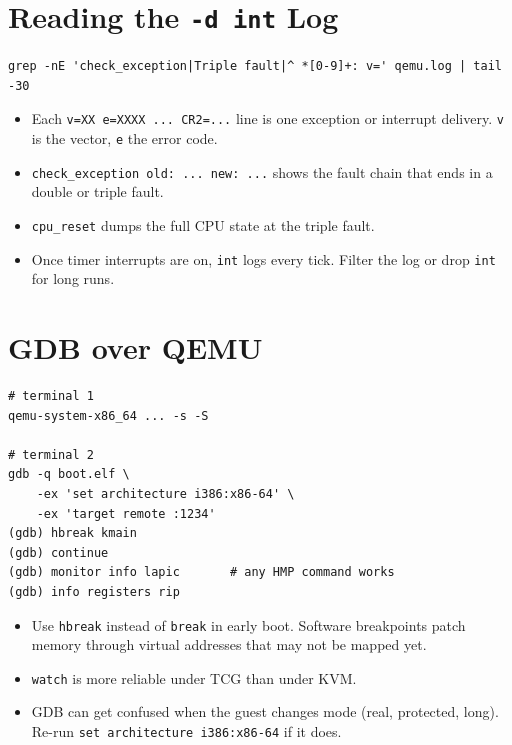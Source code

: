 \documentclass[11pt,a4paper]{article}
\newcommand{\cmd}[1]{\texttt{#1}}
\begin{document}
\section{Reading the \texttt{-d int} Log}

\begin{lstlisting}
grep -nE 'check_exception|Triple fault|^ *[0-9]+: v=' qemu.log | tail -30
\end{lstlisting}

\begin{itemize}
  \item Each \cmd{v=XX e=XXXX ... CR2=...} line is one exception or interrupt
        delivery. \cmd{v} is the vector, \cmd{e} the error code.
  \item \cmd{check\_exception old: ... new: ...} shows the fault chain that ends
        in a double or triple fault.
  \item \cmd{cpu\_reset} dumps the full CPU state at the triple fault.
  \item Once timer interrupts are on, \cmd{int} logs every tick. Filter the log
        or drop \cmd{int} for long runs.
\end{itemize}
\section{GDB over QEMU}\label{sec:gdb}

\begin{lstlisting}
# terminal 1
qemu-system-x86_64 ... -s -S

# terminal 2
gdb -q boot.elf \
    -ex 'set architecture i386:x86-64' \
    -ex 'target remote :1234'
(gdb) hbreak kmain
(gdb) continue
(gdb) monitor info lapic       # any HMP command works
(gdb) info registers rip
\end{lstlisting}

\begin{itemize}
  \item Use \cmd{hbreak} instead of \cmd{break} in early boot. Software
        breakpoints patch memory through virtual addresses that may not be
        mapped yet.
  \item \cmd{watch} is more reliable under TCG than under KVM.
  \item GDB can get confused when the guest changes mode (real, protected,
        long). Re-run \cmd{set architecture i386:x86-64} if it does.
\end{itemize}
\end{document}
